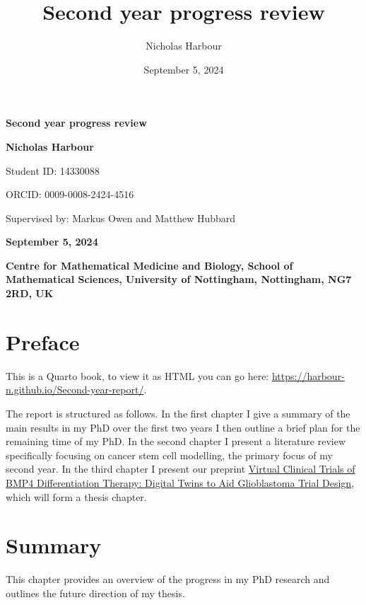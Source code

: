 \documentclass[
  letterpaper,
]{scrreprt}
\title{Second year progress review}
\author{Nicholas Harbour}
\date{September 5, 2024}
\renewcommand*\contentsname{Table of contents}
\newcommand\contentsname{Table of contents}
\theoremstyle{definition}
\theoremstyle{remark}
\begin{document}
\cleardoublepage
\thispagestyle{empty}
{\centering
{\Huge\bfseries Second year progress review \par}
\vspace{12ex}
{\Large\bfseries Nicholas Harbour \par}
{\Large Student ID: 14330088 \par}
{\Large ORCID: 0009-0008-2424-4516 \par}
{\Large Supervised by: Markus Owen and Matthew Hubbard\par}
{\bfseries\large September 5, 2024 \par}
\vspace{12ex}
%
%
{\bfseries\large Centre for Mathematical Medicine and Biology, School of
Mathematical Sciences, University of Nottingham, Nottingham, NG7 2RD,
UK \par}
%
}

\renewcommand*\contentsname{Table of contents}
{
\hypersetup{linkcolor=}
\setcounter{tocdepth}{2}
\tableofcontents
}


\chapter*{Preface}\label{preface}


This is a Quarto book, to view it as HTML you can go here:
\url{https://harbour-n.github.io/Second-year-report/}.

The report is structured as follows. In the first chapter I give a
summary of the main results in my PhD over the first two years I then
outline a brief plan for the remaining time of my PhD. In the second
chapter I present a literature review specifically focusing on cancer
stem cell modelling, the primary focus of my second year. In the third
chapter I present our preprint
\href{https://www.biorxiv.org/content/10.1101/2024.08.22.609156v1.abstract}{Virtual
Clinical Trials of BMP4 Differentiation Therapy: Digital Twins to Aid
Glioblastoma Trial Design}, which will form a thesis chapter.


\chapter{Summary}\label{summary}

This chapter provides an overview of the progress in my PhD research and
outlines the future direction of my thesis.
\end{document}
